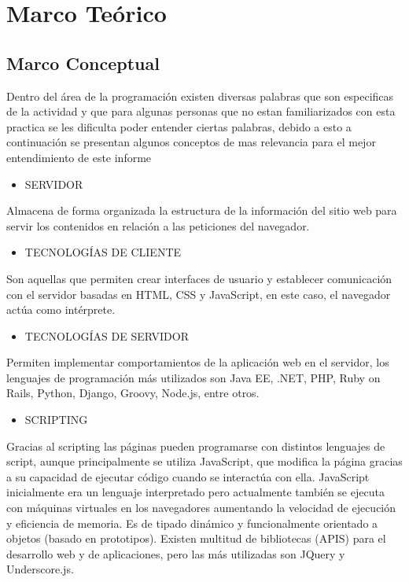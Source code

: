 \renewcommand{\thesection}{\Roman{section}}
\section{Marco Teórico}

\renewcommand{\thesection}{\arabic{section}}
\subsection{Marco Conceptual}

{\large Dentro del área de la programación existen diversas palabras que son especificas de la actividad y que para algunas personas que no estan familiarizados con esta practica se les dificulta poder entender ciertas palabras, debido a esto a continuación se presentan algunos conceptos de mas relevancia para el mejor entendimiento de este informe}\\

\begin{itemize}
\item SERVIDOR
\end{itemize}
{\large Almacena de forma organizada la estructura de la información del sitio web para servir los contenidos en relación a las peticiones del navegador.}\\

\begin{itemize}
\item TECNOLOGÍAS DE CLIENTE
\end{itemize}
{\large Son aquellas que permiten crear interfaces de usuario y establecer comunicación con el servidor basadas en HTML, CSS y JavaScript, en este caso, el navegador actúa como intérprete.}\\

\begin{itemize}
\item TECNOLOGÍAS DE SERVIDOR
\end{itemize}
{\large Permiten implementar comportamientos de la aplicación web en el servidor, los lenguajes de programación más utilizados son Java EE, .NET, PHP, Ruby on Rails, Python, Django, Groovy, Node.js, entre otros.}\\

\begin{itemize}
\item SCRIPTING
\end{itemize}
{\large Gracias al scripting las páginas pueden programarse con distintos lenguajes de script, aunque principalmente se utiliza JavaScript, que modifica la página gracias a su capacidad de ejecutar código cuando se interactúa con ella. JavaScript inicialmente era un lenguaje interpretado pero actualmente también se ejecuta con máquinas virtuales en los navegadores aumentando la velocidad de ejecución y eficiencia de memoria. Es de tipado dinámico y funcionalmente orientado a objetos (basado en prototipos).
Existen multitud de bibliotecas (APIS) para el desarrollo web y de aplicaciones, pero las más utilizadas son JQuery y Underscore.js.
}\\

